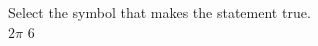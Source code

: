 \documentclass{ximera}
\author{David Kish}
\begin{document}
\begin{exercise}
Select the symbol that makes the statement true.\\
$2\pi$ \wordChoice{\choice{$<$}\choice[correct]{$>$}\choice{$=$}} $6$ 

\end{exercise}
\end{document}
